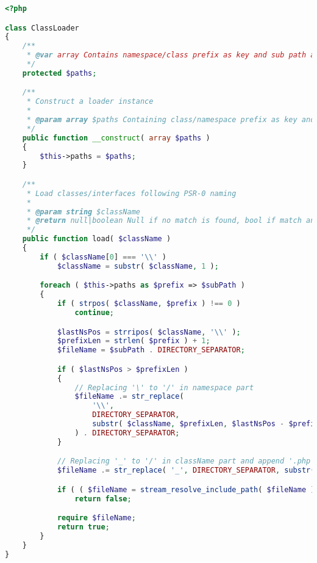 \begin{lstlisting}[language=PHP]
<?php

class ClassLoader
{
    /**
     * @var array Contains namespace/class prefix as key and sub path as value
     */
    protected $paths;

    /**
     * Construct a loader instance
     *
     * @param array $paths Containing class/namespace prefix as key and sub path as value
     */
    public function __construct( array $paths )
    {
        $this->paths = $paths;
    }

    /**
     * Load classes/interfaces following PSR-0 naming
     *
     * @param string $className
     * @return null|boolean Null if no match is found, bool if match and found/not found.
     */
    public function load( $className )
    {
        if ( $className[0] === '\\' )
            $className = substr( $className, 1 );

        foreach ( $this->paths as $prefix => $subPath )
        {
            if ( strpos( $className, $prefix ) !== 0 )
                continue;

            $lastNsPos = strripos( $className, '\\' );
            $prefixLen = strlen( $prefix ) + 1;
            $fileName = $subPath . DIRECTORY_SEPARATOR;

            if ( $lastNsPos > $prefixLen )
            {
                // Replacing '\' to '/' in namespace part
                $fileName .= str_replace(
                    '\\',
                    DIRECTORY_SEPARATOR,
                    substr( $className, $prefixLen, $lastNsPos - $prefixLen )
                ) . DIRECTORY_SEPARATOR;
            }

            // Replacing '_' to '/' in className part and append '.php'
            $fileName .= str_replace( '_', DIRECTORY_SEPARATOR, substr( $className, $lastNsPos + 1 ) ) . '.php';

            if ( ( $fileName = stream_resolve_include_path( $fileName ) ) === false )
                return false;

            require $fileName;
            return true;
        }
    }
}
\end{lstlisting}



\begin{lstlisting}[language=PHP]

\end{lstlisting}



